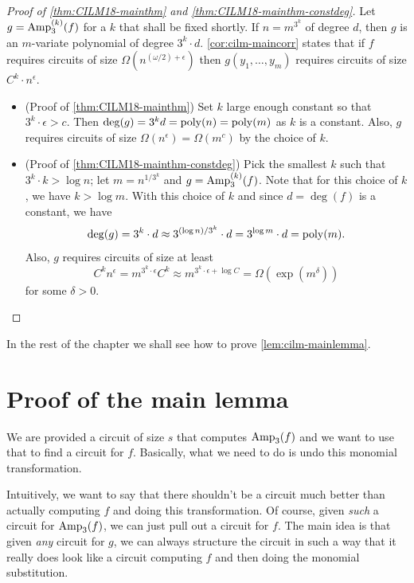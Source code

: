 \begin{proof}[Proof of \autoref{thm:CILM18-mainthm} and \autoref{thm:CILM18-mainthm-constdeg}]
  Let $g = \operatorname{Amp}_3^{(k)}(f)$ for a $k$ that shall be fixed shortly. If $n = m^{3^k}$ of degree $d$, then $g$ is an $m$-variate polynomial of degree $3^k \cdot d$. \autoref{cor:cilm-maincorr} states that if $f$ requires circuits of size $\Omega(n^{(\omega/2) + \epsilon})$ then $g(y_1,\ldots, y_m)$ requires circuits of size $C^k \cdot n^\epsilon$.

  \begin{itemize}
  \item (Proof of \autoref{thm:CILM18-mainthm}) Set $k$ large enough constant so that $3^k \cdot \epsilon > c$. Then $\deg(g) = 3^k d = \operatorname{poly}(n) = \operatorname{poly}(m)$ as $k$ is a constant. Also, $g$ requires circuits of size $\Omega(n^\epsilon) = \Omega(m^c)$ by the choice of $k$.

  \item (Proof of \autoref{thm:CILM18-mainthm-constdeg}) Pick the smallest $k$ such that $3^k \cdot k > \log n$; let $m = n^{1/3^k}$ and $g = \operatorname{Amp}_3^{(k)}(f)$.
Note that for this choice of $k$, we have $k > \log m$. 
    With this choice of $k$ and since $d = \deg(f)$ is a constant, we have
    \[
      \deg(g) = 3^k \cdot d \approx 3^{(\log n) / 3^k} \cdot d = 3^{\log m} \cdot d = \operatorname{poly}(m).
    \]
    Also, $g$ requires circuits of size at least
    \[
      C^k n^\epsilon = m^{3^k \cdot \epsilon} C^k \approx m^{3^k \cdot \epsilon + \log C}= \Omega(\exp(m^\delta))
    \]
    for some $\delta > 0$. \qedhere
  \end{itemize}
\end{proof}

\noindent
In the rest of the chapter we shall see how to prove \autoref{lem:cilm-mainlemma}.

\section{Proof of the main lemma}

We are provided a circuit of size $s$ that computes $\operatorname{Amp}_3(f)$ and we want to use that to find a circuit for $f$. Basically, what we need to do is undo this monomial transformation.

Intuitively, we want to say that there shouldn't be a circuit much better than actually computing $f$ and doing this transformation. Of course, given \emph{such} a circuit for $\operatorname{Amp}_3(f)$, we can just pull out a circuit for $f$. The main idea is that given \emph{any} circuit for $g$, we can always structure the circuit in such a way that it really does look like a circuit computing $f$ and then doing the monomial substitution.


